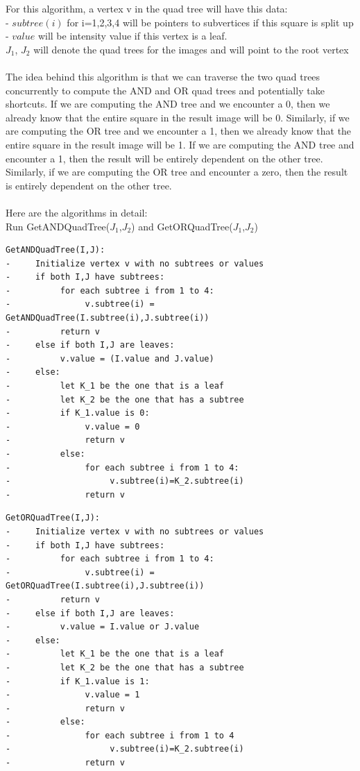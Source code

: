 \documentclass[11pt,psfig]{article}
\begin{document}
For this algorithm, a vertex v in the quad tree will have this data:\\
- $subtree(i)$ for i=1,2,3,4 will be pointers to subvertices if this square is split up\\
- $value$ will be intensity value if this vertex is a leaf. \\
$J_1$, $J_2$ will denote the quad trees for the images and will point to the root vertex \\
\\
The idea behind this algorithm is that we can traverse the two quad trees concurrently to compute the AND and OR quad trees and potentially take shortcuts. If we are computing the AND tree and we encounter a 0, then we already know that the entire square in the result image will be 0. Similarly, if we are computing the OR tree and we encounter a 1, then we already know that the entire square in the result image will be 1. If we are computing the AND tree and encounter a 1, then the result will be entirely dependent on the other tree. Similarly, if we are computing the OR tree and encounter a zero, then the result is entirely dependent on the other tree.\\
\\
Here are the algorithms in detail:\\
Run GetANDQuadTree($J_1$,$J_2$) and GetORQuadTree($J_1$,$J_2$)
\begin{verbatim}
GetANDQuadTree(I,J):
-     Initialize vertex v with no subtrees or values
-     if both I,J have subtrees:
-          for each subtree i from 1 to 4:
-               v.subtree(i) = GetANDQuadTree(I.subtree(i),J.subtree(i))
-          return v
-     else if both I,J are leaves:
-          v.value = (I.value and J.value)
-     else:
-          let K_1 be the one that is a leaf
-          let K_2 be the one that has a subtree
-          if K_1.value is 0:
-               v.value = 0
-               return v
-          else:
-               for each subtree i from 1 to 4:
-                    v.subtree(i)=K_2.subtree(i)
-               return v
\end{verbatim}
\newpage
\begin{verbatim}
GetORQuadTree(I,J):
-     Initialize vertex v with no subtrees or values
-     if both I,J have subtrees:
-          for each subtree i from 1 to 4:
-               v.subtree(i) = GetORQuadTree(I.subtree(i),J.subtree(i))
-          return v
-     else if both I,J are leaves:
-          v.value = I.value or J.value
-     else:
-          let K_1 be the one that is a leaf
-          let K_2 be the one that has a subtree
-          if K_1.value is 1:
-               v.value = 1
-               return v
-          else:
-               for each subtree i from 1 to 4
-                    v.subtree(i)=K_2.subtree(i)
-               return v

\end{verbatim}


\end{document}
